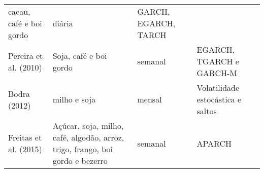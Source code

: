 \documentclass[]{article}
\begin{document}
\begin{longtable}[]{@{}llll@{}}
\begin{minipage}[t]{0.17\columnwidth}
cacau, café e boi gordo\strut
\end{minipage} & \begin{minipage}[t]{0.15\columnwidth}\raggedright\strut
diária\strut
\end{minipage} & \begin{minipage}[t]{0.23\columnwidth}\raggedright\strut
GARCH, EGARCH, TARCH\strut
\end{minipage}\tabularnewline
\begin{minipage}[t]{0.17\columnwidth}\raggedright\strut
Pereira et al. (2010)\strut
\end{minipage} & \begin{minipage}[t]{0.17\columnwidth}\raggedright\strut
Soja, café e boi gordo\strut
\end{minipage} & \begin{minipage}[t]{0.15\columnwidth}\raggedright\strut
semanal\strut
\end{minipage} & \begin{minipage}[t]{0.23\columnwidth}\raggedright\strut
EGARCH, TGARCH e GARCH-M\strut
\end{minipage}\tabularnewline
\begin{minipage}[t]{0.17\columnwidth}\raggedright\strut
Bodra (2012)\strut
\end{minipage} & \begin{minipage}[t]{0.17\columnwidth}\raggedright\strut
milho e soja\strut
\end{minipage} & \begin{minipage}[t]{0.15\columnwidth}\raggedright\strut
mensal\strut
\end{minipage} & \begin{minipage}[t]{0.23\columnwidth}\raggedright\strut
Volatilidade estocástica e saltos\strut
\end{minipage}\tabularnewline
\begin{minipage}[t]{0.17\columnwidth}\raggedright\strut
Freitas et al. (2015)\strut
\end{minipage} & \begin{minipage}[t]{0.17\columnwidth}\raggedright\strut
Açúcar, soja, milho, café, algodão, arroz, trigo, frango, boi gordo e
bezerro\strut
\end{minipage} & \begin{minipage}[t]{0.15\columnwidth}\raggedright\strut
semanal\strut
\end{minipage} & \begin{minipage}[t]{0.23\columnwidth}\raggedright\strut
APARCH\strut
\end{minipage}\tabularnewline
\bottomrule
\end{longtable}
\end{document}
